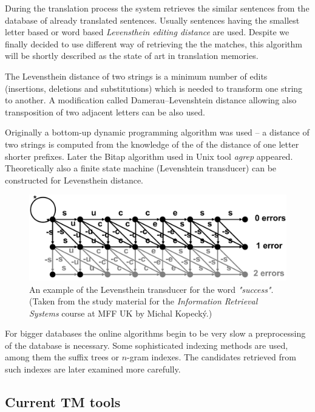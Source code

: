 During the translation process the system retrieves the similar sentences from the database of already translated sentences. Usually sentences having the smallest letter based or word based \emph{Levensthein editing distance} are used. Despite we finally decided to use different way of retrieving the the matches, this algorithm will be shortly described as the state of art in translation memories.

The Levensthein distance of two strings is a minimum number of edits (insertions, deletions and substitutions) which is needed to transform one string to another. A modification called Damerau–Levenshtein distance allowing also transposition of two adjacent letters can be also used.

Originally a bottom-up dynamic programming algorithm was used -- a distance of two strings is computed from the knowledge of the of the distance of one letter shorter prefixes. Later the Bitap algorithm used in Unix tool \emph{agrep} appeared. Theoretically also a finite state machine (Levenshtein transducer) can be constructed for Levensthein distance.

\begin{figure}
\begin{center}
\includegraphics[scale=0.65]{./figures/levensthein.pdf}
\end{center}

\caption{An example of the Levensthein transducer for the word \emph{"success"}. (Taken from the study material for the \emph{Information Retrieval Systems} course at MFF UK by Michal Kopecký.)}
\end{figure}

For bigger databases the online algorithms begin to be very slow a preprocessing of the database is necessary. Some sophisticated indexing methods are used, among them the suffix trees or $n$-gram indexes. The candidates retrieved from such indexes are later examined more carefully.

\subsection{Current TM tools}


